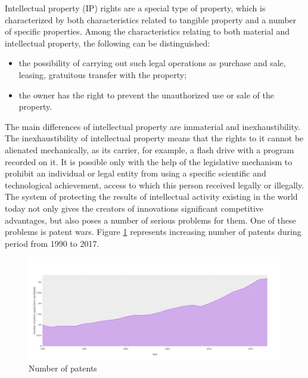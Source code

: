 \documentclass[12pt,twoside]{reedthesis}
\providecommand{\tightlist}{%
  \setlength{\itemsep}{0pt}\setlength{\parskip}{0pt}}
\begin{document}
Intellectual property (IP) rights are a special type of property, which is characterized by both characteristics related to tangible property and a number of specific properties. Among the characteristics relating to both material and intellectual property, the following can be distinguished:
\begin{itemize}
\tightlist
\item
  the possibility of carrying out such legal operations as purchase and sale, leasing, gratuitous transfer with the property;
\item
  the owner has the right to prevent the unauthorized use or sale of the property.
\end{itemize}
The main differences of intellectual property are immaterial and inexhaustibility. The inexhaustibility of intellectual property means that the rights to it cannot be alienated mechanically, as its carrier, for example, a flash drive with a program recorded on it. It is possible only with the help of the legislative mechanism to prohibit an individual or legal entity from using a specific scientific and technological achievement, access to which this person received legally or illegally. The system of protecting the results of intellectual activity existing in the world today not only gives the creators of innovations significant competitive advantages, but also poses a number of serious problems for them. One of these problems is patent wars. Figure \ref{fig:numberofpatents} represents increasing number of patents during period from 1990 to 2017.
\begin{figure}[h]

{\centering \includegraphics[width=0.9\linewidth,]{figure/Numberofpatents} 

}

\caption{Number of patents}\label{fig:numberofpatents}
\end{figure}
\end{document}
